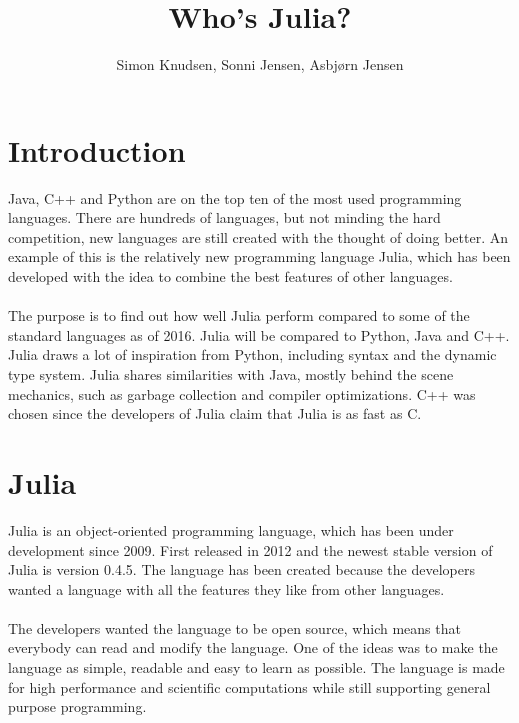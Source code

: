 \documentclass[landscape, a0]{sciposter}
\title{Who's Julia?}
\author{Simon Knudsen, Sonni Jensen, Asbjørn Jensen}
\institute{Department of Mathematics and Computer Science,\\
	University of Southern Denmark\\}
\begin{document}
\maketitle

\begin{multicols}{3}


\section{Introduction}
Java, C++ and Python are on the top ten of the most used programming languages. There are hundreds of languages, but not minding the hard competition, new languages are still created with the thought of doing better. An example of this is the relatively new programming language Julia, which has been developed with the idea to combine the best features of other languages.\\
\\
The purpose is to find out how well Julia perform compared to some of the standard languages as of 2016. Julia will be compared to Python, Java and C++. Julia draws a lot of inspiration from Python, including syntax and the dynamic type system. Julia shares similarities with Java, mostly behind the scene mechanics, such as garbage collection and compiler optimizations. C++ was chosen since the developers of Julia claim that Julia is as fast as C.

\section{Julia}
Julia is an object-oriented programming language, which has been under development since 2009. First released in 2012 and the newest stable version of Julia is version 0.4.5. The language has been created because the developers wanted a language with all the features they like from other languages. \\
\\
The developers wanted the language to be open source, which means that everybody can read and modify the language. One of the ideas was to make the language as simple, readable and easy to learn as possible. The language is made for high performance and scientific computations while still supporting general purpose programming.


\end{multicols}
\end{document}
